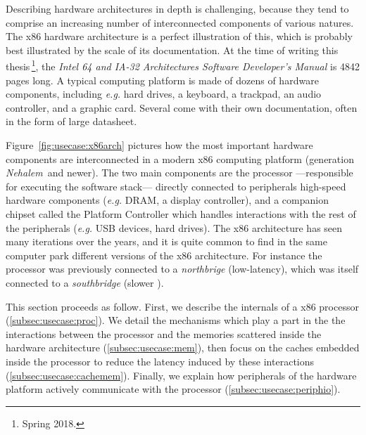 Describing hardware architectures in depth is challenging, because they tend to
comprise an increasing number of interconnected components of various natures.
%
The x86 hardware architecture is a perfect illustration of this, which is
probably best illustrated by the scale of its documentation.
%
At the time of writing this thesis\,\footnote{Spring 2018.}, the \emph{Intel 64
  and IA-32 Architectures Software Developer’s Manual} is 4842 pages long.
%
A typical computing platform is made of dozens of hardware components, including
\emph{e.g.} hard drives, a keyboard, a trackpad, an audio controller, and a
graphic card.
%
Several come with their own documentation, often in the form of large datasheet.

Figure~\ref{fig:usecase:x86arch} pictures how the most important hardware
components are interconnected in a modern x86 computing platform (generation
\emph{Nehalem}\,\cite{thomadakis2011nehalem} and newer).
%
The two main components are the processor ---responsible for executing the
software stack--- directly connected to peripherals high-speed hardware
components (\emph{e.g.}  DRAM, a display controller), and a companion chipset
called the Platform Controller which handles interactions with the rest of the
peripherals (\emph{e.g.} USB devices, hard drives).
%
The x86 architecture has seen many iterations over the years, and it is quite
common to find in the same computer park different versions of the x86
architecture.
%
For instance the processor was previously connected to a \emph{northbrige}
(low-latency), which was itself connected to a \emph{southbridge} (slower \IOs).

This section proceeds as follow.
%
First, we describe the internals of a x86 processor (\ref{subsec:usecase:proc}).
%
We detail the mechanisms which play a part in the the interactions between the
processor and the memories scattered inside the hardware architecture
(\ref{subsec:usecase:mem}), then focus on the caches embedded inside the
processor to reduce the latency induced by these interactions
(\ref{subsec:usecase:cachemem}).
%
Finally, we explain how peripherals of the hardware platform actively
communicate with the processor (\ref{subsec:usecase:periphio}).

